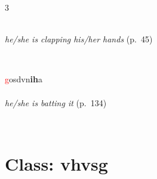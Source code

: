 \documentclass[oneside,openany]{book}%
\begin{document}
\begin{multicols}{3}
\begin{minipage}[t]{\linewidth}
\\
\noindent \textit{he/she is clapping his/her hands} (p.~45)
\end{minipage}\\[1em]%
\begin{minipage}[t]{\linewidth}
\raggedright\noindent \textcolor{Red}{g}osdvn\textbf{ih}a\\
\\
\noindent \textit{he/she is batting it} (p.~134)
\end{minipage}\\[1em]%
\end{multicols}%
\vspace{1em}%
\needspace{3in}%
\section*{Class: vhvsg}%
%
\needspace{1.5in}%
\end{document}
